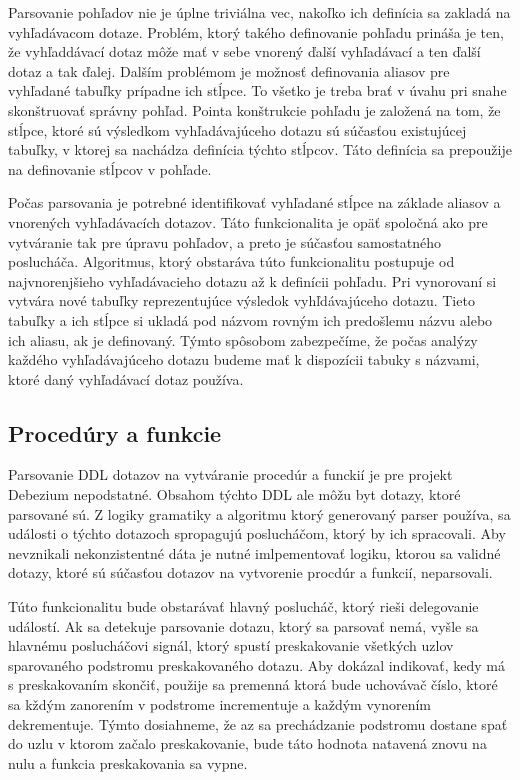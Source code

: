 Parsovanie pohľadov nie je úplne triviálna vec, nakoľko ich definícia sa zakladá na vyhľadávacom dotaze. Problém, ktorý takého definovanie pohľadu prináša je ten, že vyhľaddávací dotaz môže mať v sebe vnorený ďalší vyhľadávací a ten ďalší dotaz a tak ďalej. Dalším problémom je možnosť definovania aliasov pre vyhľadané tabuľky prípadne ich stĺpce. To všetko je treba brať v úvahu pri snahe skonštruovať správny pohľad. Pointa konštrukcie pohľadu je založená na tom, že stĺpce, ktoré sú výsledkom vyhľadávajúceho dotazu sú súčasťou existujúcej tabuľky, v ktorej sa nachádza definícia týchto stĺpcov. Táto definícia sa prepoužije na definovanie stĺpcov v pohľade. 

Počas parsovania je potrebné identifikovať vyhľadané stĺpce na základe aliasov a vnorených vyhľadávacích dotazov. Táto funkcionalita je opäť spoločná ako pre vytváranie tak pre úpravu pohľadov, a preto je súčasťou samostatného poslucháča. Algoritmus, ktorý obstaráva túto funkcionalitu postupuje od najvnorenjšieho vyhľadávacieho dotazu až k definícii pohľadu. Pri vynorovaní si vytvára nové tabuľky reprezentujúce výsledok vyhľdávajúceho dotazu. Tieto tabuľky a ich stĺpce si ukladá pod názvom rovným ich predošlemu názvu alebo ich aliasu, ak je definovaný. Týmto spôsobom zabezpečíme, že počas analýzy každého vyhľadávajúceho dotazu budeme mať k dispozícii tabuky s názvami, ktoré daný vyhľadávací dotaz používa.

\subsection{Procedúry a funkcie}
Parsovanie DDL dotazov na vytváranie procedúr a funckií je pre projekt Debezium nepodstatné. Obsahom týchto DDL ale môžu byt dotazy, ktoré parsované sú. Z logiky gramatiky a algoritmu ktorý generovaný parser používa, sa události o týchto dotazoch spropagujú poslucháčom, ktorý by ich spracovali. Aby nevznikali nekonzistentné dáta je nutné imlpementovať logiku, ktorou sa validné dotazy, ktoré sú súčasťou dotazov na vytvorenie procdúr a funkcií, neparsovali.

Túto funkcionalitu bude obstarávať hlavný poslucháč, ktorý rieši delegovanie událostí. Ak sa detekuje parsovanie dotazu, ktorý sa parsovať nemá, vyšle sa hlavnému poslucháčovi signál, ktorý spustí preskakovanie všetkých uzlov sparovaného podstromu preskakovaného dotazu. Aby dokázal indikovať, kedy má s preskakovaním skončiť, použije sa premenná ktorá bude uchovávač číslo, ktoré sa kždým zanorením v podstrome incrementuje a každým vynorením dekrementuje. Týmto dosiahneme, že az sa prechádzanie podstromu dostane spať do uzlu v ktorom začalo preskakovanie, bude táto hodnota natavená znovu na nulu a funkcia preskakovania sa vypne.

